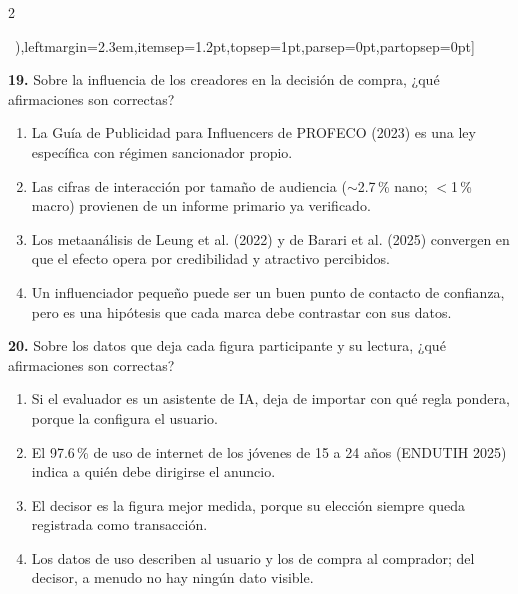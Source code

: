 \documentclass[10pt,letterpaper]{article}
\newcommand{\cas}{\framebox[1.0em]{\rule{0pt}{1.05ex}}}
\begin{document}
\begin{multicols}{2}
\begin{minipage}[t]{\columnwidth}
\begin{enumerate}[label=\cas\ \alph*),leftmargin=2.3em,itemsep=1.2pt,topsep=1pt,parsep=0pt,partopsep=0pt]
\end{enumerate}\end{minipage}\par\vspace{3pt}
\begin{minipage}[t]{\columnwidth}\noindent\textbf{19.} Sobre la influencia de los creadores en la decisión de compra, ¿qué afirmaciones son correctas?
\vspace{1pt}\begin{enumerate}[label=\cas\ \alph*),leftmargin=2.3em,itemsep=1.2pt,topsep=1pt,parsep=0pt,partopsep=0pt]
\item La Guía de Publicidad para Influencers de PROFECO (2023) es una ley específica con régimen sancionador propio.
\item Las cifras de interacción por tamaño de audiencia (${\sim}$2.7\,\% nano; $<$1\,\% macro) provienen de un informe primario ya verificado.
\item Los metaanálisis de Leung et al. (2022) y de Barari et al. (2025) convergen en que el efecto opera por credibilidad y atractivo percibidos.
\item Un influenciador pequeño puede ser un buen punto de contacto de confianza, pero es una hipótesis que cada marca debe contrastar con sus datos.
\end{enumerate}\end{minipage}\par\vspace{3pt}
\begin{minipage}[t]{\columnwidth}\noindent\textbf{20.} Sobre los datos que deja cada figura participante y su lectura, ¿qué afirmaciones son correctas?
\vspace{1pt}\begin{enumerate}[label=\cas\ \alph*),leftmargin=2.3em,itemsep=1.2pt,topsep=1pt,parsep=0pt,partopsep=0pt]
\item Si el evaluador es un asistente de IA, deja de importar con qué regla pondera, porque la configura el usuario.
\item El 97.6\,\% de uso de internet de los jóvenes de 15 a 24 años (ENDUTIH 2025) indica a quién debe dirigirse el anuncio.
\item El decisor es la figura mejor medida, porque su elección siempre queda registrada como transacción.
\item Los datos de uso describen al usuario y los de compra al comprador; del decisor, a menudo no hay ningún dato visible.
\end{enumerate}\end{minipage}\par\vspace{3pt}

\end{multicols}
\end{document}

